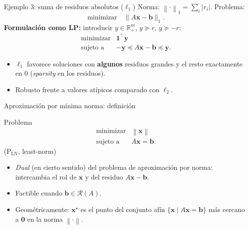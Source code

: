 \documentclass[10pt,aspectratio=169]{beamer}
\newcommand{\R}{\mathbb{R}}
\newcommand{\x}{\mathbf{x}}
\newcommand{\y}{\mathbf{y}}
\newcommand{\xb}{\mathbf{b}}
\newcommand{\0}{\mathbf{0}}
\newcommand{\1}{\mathbf{1}}
\newcommand{\norm}[1]{\left\|#1\right\|}
\begin{document}
\begin{frame}{Ejemplo 3: suma de residuos absolutos ($\ell_1$)}
  Norma: $\norm{\cdot}_1 = \sum_i |r_i|$. Problema:
  \[
    \text{minimizar}\quad \|A\x-\xb\|_1.
  \]
  \textbf{Formulación como LP:} introducir $y\in\R^m_+$, $y\succeq r$, $y\succeq -r$:
  \[
    \begin{array}{ll}
      \text{minimizar} & \1^\top\y \\
      \text{sujeto a}  & -\y \preceq A\x - \xb \preceq \y.
    \end{array}
  \]
  \begin{itemize}
    \item $\ell_1$ favorece soluciones con \textbf{algunos} residuos grandes y el resto
          exactamente en $0$ (\emph{sparsity} en los residuos).
    \item Robusto frente a valores atípicos comparado con $\ell_2$.
  \end{itemize}
\end{frame}

\begin{frame}{Aproximación por mínima norma: definición}
  \begin{block}{Problema}
    \begin{equation*}
      \begin{array}{ll}
        \text{minimizar} & \norm{\x} \\
        \text{sujeto a}  & A\x = \xb.
      \end{array}
    \end{equation*}
    \hfill (P$_{\text{LN}}$, least-norm)
  \end{block}
  \begin{itemize}
    \item \emph{Dual} (en cierto sentido) del problema de aproximación por norma:
          intercambia el rol de $\x$ y del residuo $A\x-\xb$.
    \item Factible cuando $\xb\in\mathcal{R}(A)$.
    \item Geométricamente: $\x^\star$ es el punto del conjunto afín
          $\{\x\mid A\x=\xb\}$ más cercano a $\0$ en la norma $\norm{\cdot}$.
  \end{itemize}
\end{frame}
\end{document}
